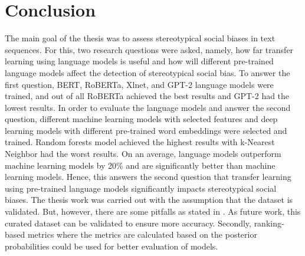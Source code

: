 \chapter{Conclusion}
The main goal of the thesis was to assess stereotypical social biases in text sequences. For this, two research questions were asked, namely, how far transfer learning using language models is useful and how will different pre-trained language models affect the detection of stereotypical social bias. To answer the first question, BERT, RoBERTa, Xlnet, and GPT-2 language models were trained, and out of all RoBERTa achieved the best results and GPT-2 had the lowest results. In order to evaluate the language models and answer the second question, different machine learning models with selected features and deep learning models with different pre-trained word embeddings were selected and trained. Random forests model achieved the highest results with k-Nearest Neighbor had the worst results. On an average, language models outperform machine learning models by 20\% and are significantly better than machine learning models. Hence, this answers the second question that transfer learning using pre-trained language models significantly impacts stereotypical social biases. The thesis work was carried out with the assumption that the dataset is validated. But, however, there are some pitfalls as stated in \cite{blodgett2021stereotyping}. As future work, this curated dataset can be validated to ensure more accuracy. Secondly, ranking-based metrics where the metrics are calculated based on the posterior probabilities could be used for better evaluation of models. 


